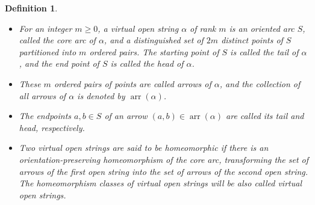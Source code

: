 \documentclass[11pt]{amsart}
\theoremstyle{noparens}
\newtheorem{definition}{Definition}[section]
\numberwithin{equation}{section}
\numberwithin{equation}{section}
\begin{document}
\begin{definition} {\rm 
\begin{itemize}
\item[(i)] For an integer $m\geq 0$, a \textit{virtual open string} $\alpha$ of rank $m$ is an oriented arc $S$, called the \textit{core arc} of $\alpha$, and a distinguished set of $2m$ distinct points of $S$ partitioned into $m$ ordered pairs. The starting point of $S$ is called the \textit{tail} of $\alpha$, and the end point of $S$ is called the \textit{head} of $\alpha$. 
\item[(ii)] These $m$ ordered pairs of points are called \textit{arrows} of $\alpha$, and the collection of all arrows of $\alpha$ is denoted by $\operatorname{arr}(\alpha)$. 
\item[(iii)] The endpoints $a, b\in S$ of an arrow $(a, b) \in \operatorname{arr}(\alpha)$ are called its \textit{tail} and \textit{head}, respectively.  
\item[(iv)] Two virtual open strings are said to be \textit{homeomorphic} if there is an orientation-preserving homeomorphism of the core arc, transforming the set of arrows of the first open string into the set of arrows of the second open string. The homeomorphism classes of virtual open strings will be also called virtual open strings.
\end{itemize}
 }
\end{definition}
\end{document}
